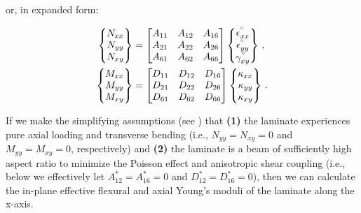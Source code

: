 \documentclass[twocolumn, linenumbers, superscriptaddress, nofootinbib]{revtex4-1}
\begin{document}
				or, in expanded form:
				
				\begin{equation}
					\begin{aligned}
						\begin{Bmatrix}
							N_{xx} \\
							N_{yy} \\
							N_{xy}
						\end{Bmatrix}
						& =
						\begin{bmatrix}
							A_{11} & A_{12} & A_{16} \\
							A_{21} & A_{22} & A_{26} \\
							A_{61} & A_{62} & A_{66}
						\end{bmatrix}
						\begin{Bmatrix}
							\epsilon^{\degree}_{xx} \\
							\epsilon^{\degree}_{yy} \\
							\gamma^{\degree}_{xy}
						\end{Bmatrix}\,,
						\\
						\begin{Bmatrix}
							M_{xx} \\
							M_{yy} \\
							M_{xy}
						\end{Bmatrix}
						& =
						\begin{bmatrix}
							D_{11} & D_{12} & D_{16} \\
							D_{21} & D_{22} & D_{26} \\
							D_{61} & D_{62} & D_{66}
						\end{bmatrix}
						\begin{Bmatrix}
							\kappa_{xx} \\
							\kappa_{yy} \\
							\kappa_{xy}
						\end{Bmatrix}\,.
					\end{aligned}
				\end{equation}
				
				If we make the simplifying assumptions (see \cite{Jones2014, Reddy2004}) that \textbf{(1)} the laminate experiences pure axial loading and transverse bending (i.e., $N_{yy} = N_{xy} = 0$ and $M_{yy} = M_{xy} = 0$, respectively) and \textbf{(2)} the laminate is a beam of sufficiently high aspect ratio to minimize the Poisson effect and anisotropic shear coupling (i.e., below we effectively let $A^*_{12} = A^*_{16} = 0$ and $D^*_{12} = D^*_{16} = 0$), then we can calculate the in-plane effective flexural and axial Young's moduli of the laminate along the x-axis.
				
\end{document}
